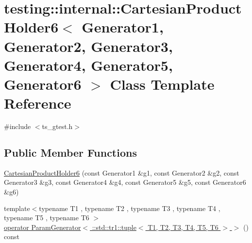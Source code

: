 \hypertarget{classtesting_1_1internal_1_1CartesianProductHolder6}{\section{testing\-:\-:internal\-:\-:Cartesian\-Product\-Holder6$<$ Generator1, Generator2, Generator3, Generator4, Generator5, Generator6 $>$ Class Template Reference}
\label{classtesting_1_1internal_1_1CartesianProductHolder6}
}


{\ttfamily \#include $<$ts\-\_\-gtest.\-h$>$}

\subsection*{Public Member Functions}
\begin{DoxyCompactItemize}
\item 
\hyperlink{classtesting_1_1internal_1_1CartesianProductHolder6_a7bb6f9224a1a6766e3634eb392e1b5f6}{Cartesian\-Product\-Holder6} (const Generator1 \&g1, const Generator2 \&g2, const Generator3 \&g3, const Generator4 \&g4, const Generator5 \&g5, const Generator6 \&g6)
\item 
{\footnotesize template$<$typename T1 , typename T2 , typename T3 , typename T4 , typename T5 , typename T6 $>$ }\\\hyperlink{classtesting_1_1internal_1_1CartesianProductHolder6_ad6ebc1f0b150eb882a5b5aaaae5f3a5c}{operator Param\-Generator$<$ \-::std\-::tr1\-::tuple$<$ T1, T2, T3, T4, T5, T6 $>$ $>$} () const 
\end{DoxyCompactItemize}


